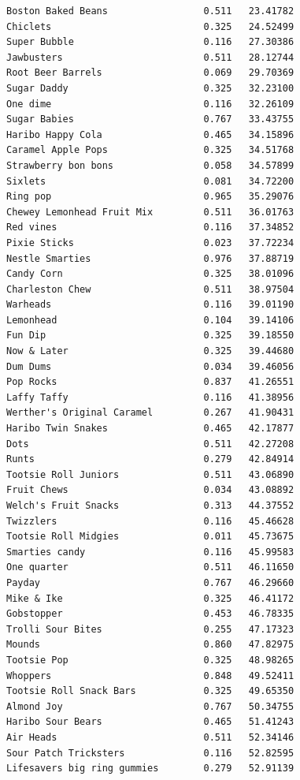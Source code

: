 \documentclass[
  letterpaper,
  DIV=11,
  numbers=noendperiod]{scrartcl}
\begin{document}
\begin{verbatim}
Boston Baked Beans                 0.511   23.41782
Chiclets                           0.325   24.52499
Super Bubble                       0.116   27.30386
Jawbusters                         0.511   28.12744
Root Beer Barrels                  0.069   29.70369
Sugar Daddy                        0.325   32.23100
One dime                           0.116   32.26109
Sugar Babies                       0.767   33.43755
Haribo Happy Cola                  0.465   34.15896
Caramel Apple Pops                 0.325   34.51768
Strawberry bon bons                0.058   34.57899
Sixlets                            0.081   34.72200
Ring pop                           0.965   35.29076
Chewey Lemonhead Fruit Mix         0.511   36.01763
Red vines                          0.116   37.34852
Pixie Sticks                       0.023   37.72234
Nestle Smarties                    0.976   37.88719
Candy Corn                         0.325   38.01096
Charleston Chew                    0.511   38.97504
Warheads                           0.116   39.01190
Lemonhead                          0.104   39.14106
Fun Dip                            0.325   39.18550
Now & Later                        0.325   39.44680
Dum Dums                           0.034   39.46056
Pop Rocks                          0.837   41.26551
Laffy Taffy                        0.116   41.38956
Werther's Original Caramel         0.267   41.90431
Haribo Twin Snakes                 0.465   42.17877
Dots                               0.511   42.27208
Runts                              0.279   42.84914
Tootsie Roll Juniors               0.511   43.06890
Fruit Chews                        0.034   43.08892
Welch's Fruit Snacks               0.313   44.37552
Twizzlers                          0.116   45.46628
Tootsie Roll Midgies               0.011   45.73675
Smarties candy                     0.116   45.99583
One quarter                        0.511   46.11650
Payday                             0.767   46.29660
Mike & Ike                         0.325   46.41172
Gobstopper                         0.453   46.78335
Trolli Sour Bites                  0.255   47.17323
Mounds                             0.860   47.82975
Tootsie Pop                        0.325   48.98265
Whoppers                           0.848   49.52411
Tootsie Roll Snack Bars            0.325   49.65350
Almond Joy                         0.767   50.34755
Haribo Sour Bears                  0.465   51.41243
Air Heads                          0.511   52.34146
Sour Patch Tricksters              0.116   52.82595
Lifesavers big ring gummies        0.279   52.91139

\end{verbatim}
\end{document}
